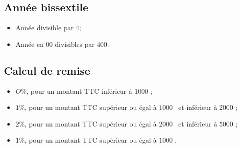 \documentclass[12pt,a4paper]{article}
\begin{document}
		\subsection{Année bissextile}
		
		\begin{itemize}
			\item Année divisible par 4;
			\item Année en 00 divisibles par 400.
		\end{itemize}
	
		\subsection{Calcul de remise}
		
		\begin{itemize}
			\item $O \%$, pour un montant TTC inférieur à $1000$ \officialeuro ;
			\item $1 \%$, pour un montant TTC supérieur ou égal à $1000$ \officialeuro\ et inférieur à $2000$ \officialeuro ;
			\item $2 \%$, pour un montant TTC supérieur ou égal à $2000$ \officialeuro\ et inférieur à $5000$ \officialeuro ;
			\item $1 \%$, pour un montant TTC supérieur ou égal à $1000$ \officialeuro .
		\end{itemize}
\end{document}
